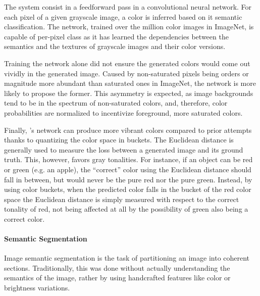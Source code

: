 The system consist in a feedforward pass in a convolutional neural network.
For each pixel of a given grayscale image, a color is inferred based on it semantic classification.
The network, trained over the million color images in ImageNet, is capable of per-pixel class as it has learned the dependencies between the semantics and the textures of grayscale images and their color versions.

Training the network alone did not ensure the generated colors would come out vividly in the generated image.
Caused by non-saturated pixels being orders or magnitude more abundant than saturated ones in ImageNet, the network is more likely to propose the former.
This asymmetry is expected, as image backgrounds tend to be in the spectrum of non-saturated colors, and, therefore, color probabilities are normalized to incentivize foreground, more saturated colors.

Finally, \citeauthor{Zhang2016}'s network can produce more vibrant colors compared to prior attempts thanks to quantizing the color space in buckets.
The Euclidean distance is generally used to measure the loss between a generated image and its ground truth.
This, however, favors gray tonalities.
For instance, if an object can be red or green (e.g. an apple), the ``correct'' color using the Euclidean distance should fall in between, but would never be the pure red nor the pure green.
Instead, by using color buckets, when the predicted color falls in the bucket of the red color space the Euclidean distance is simply measured with respect to the correct tonality of red, not being affected at all by the possibility of green also being a correct color.

\paragraph{Semantic Segmentation}
Image semantic segmentation is the task of partitioning an image into coherent sections.
Traditionally, this was done without actually understanding the semantics of the image, rather by using handcrafted features like color or brightness variations.

